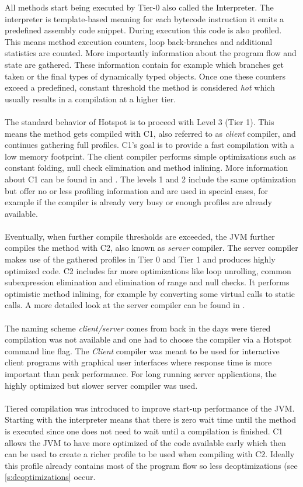 All methods start being executed by Tier-0 also called the Interpreter.
The interpreter is template-based meaning for each bytecode instruction it emits a predefined assembly code snippet.
During execution this code is also profiled. This means method execution counters, loop back-branches and additional statistics are counted. More importantly information about the program flow and state are gathered. These information contain for example which branches get taken or the final types of dynamically typed objects. Once one these counters exceed a predefined, constant threshold the method is considered \textit{hot} which usually results in a compilation at a higher tier.
\\\\
The standard behavior of Hotspot is to proceed with Level 3 (Tier 1). This means the method gets compiled with C1, also referred to as \textit{client} compiler, and continues gathering full profiles.
C1's goal is to provide a fast compilation with a low memory footprint.
The client compiler performs simple optimizations such as constant folding, null check elimination and method inlining.
More information about C1 can be found in \cite{client_compiler_talk} and \cite{client_compiler}.
The levels 1 and 2 include the same optimization but offer no or less profiling information and are used in special cases, for example if the compiler is already very busy or enough profiles are already available.
\\\\
Eventually, when further compile thresholds are exceeded, the JVM further compiles the method with C2, also known as \textit{server} compiler.
The server compiler makes use of the gathered profiles in Tier 0 and Tier 1 and produces highly optimized code. C2 includes far more optimizations like loop unrolling, common subexpression elimination and elimination of range and null checks. It performs optimistic method inlining, for example by converting some virtual calls to static calls.
A more detailed look at the server compiler can be found in \cite{server_compiler}.
\\\\
The naming scheme \textit{client/server} comes from back in the days were tiered compilation was not available and one had to choose the compiler via a Hotspot command line flag. The \textit{Client} compiler was meant to be used for interactive client programs with graphical user interfaces where response time is more important than peak performance. For long running server applications, the highly optimized but slower server compiler was used. 
\\\\
Tiered compilation was introduced to improve start-up performance of the JVM.
Starting with the interpreter means that there is zero wait time until the method is executed since one does not need to wait until a compilation is finished. C1 allows the JVM to have more optimized of the code available early which then can be used to create a richer profile to be used when compiling with C2. Ideally this profile already contains most of the program flow so less deoptimizations (see \ref{s:deoptimizations} occur.


